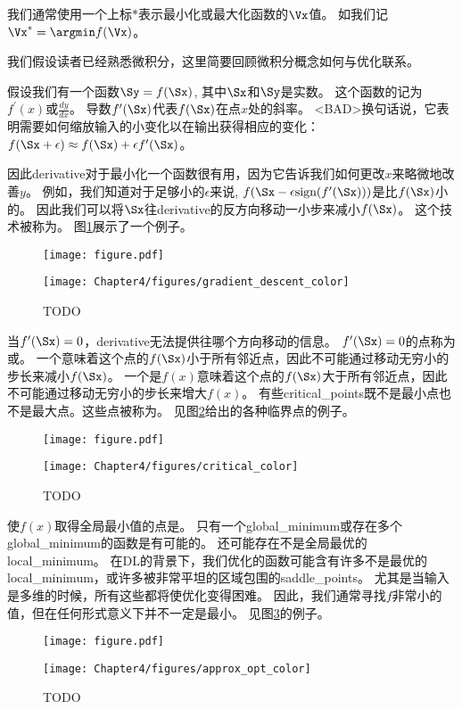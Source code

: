 我们通常使用一个上标$*$表示最小化或最大化函数的$\Vx$值。
如我们记$\Vx^*=\argmin f(\Vx)$。

我们假设读者已经熟悉微积分，这里简要回顾微积分概念如何与优化联系。


假设我们有一个函数$\Sy = f(\Sx)$, 其中$\Sx$和$\Sy$是实数。
这个函数的记为$f^\prime(x)$或$\frac{dy}{dx}$。
导数$f^\prime(\Sx)$代表$f(\Sx)$在点$x$处的斜率。
<BAD>换句话说，它表明需要如何缩放输入的小变化以在输出获得相应的变化：
$f(\Sx+\epsilon) \approx f(\Sx) + \epsilon f^\prime(\Sx) $。

因此\gls{derivative}对于最小化一个函数很有用，因为它告诉我们如何更改$x$来略微地改善$y$。
例如，我们知道对于足够小的$\epsilon$来说, $f(\Sx-\epsilon \text{sign}(f^\prime(\Sx)) )$是比$f(\Sx)$小的。
因此我们可以将$\Sx$往\gls{derivative}的反方向移动一小步来减小$f(\Sx)$。
这个技术被称为\citep{cauchy1847}。
图\ref{fig:chap4_gradient_descent_color}展示了一个例子。
\begin{figure}[!htb]
\ifOpenSource
\centerline{\texttt{[image: figure.pdf]}}
\else
\centerline{\texttt{[image: Chapter4/figures/gradient\_descent\_color]}}
\fi
\caption{TODO}
\label{fig:chap4_gradient_descent_color}
\end{figure}


当$f^\prime(\Sx)=0$，\gls{derivative}无法提供往哪个方向移动的信息。
$ f^\prime(\Sx)=0 $的点称为或。
一个意味着这个点的$f(\Sx)$小于所有邻近点，因此不可能通过移动无穷小的步长来减小$f(\Sx)$。
一个是$f(x)$意味着这个点的$f(\Sx)$大于所有邻近点，因此不可能通过移动无穷小的步长来增大$f(x)$。
有些\gls{critical_points}既不是最小点也不是最大点。这些点被称为。
见图\ref{fig:chap4_critical_color}给出的各种临界点的例子。
\begin{figure}[!htb]
\ifOpenSource
\centerline{\texttt{[image: figure.pdf]}}
\else
\centerline{\texttt{[image: Chapter4/figures/critical\_color]}}
\fi
\caption{TODO}
\label{fig:chap4_critical_color}
\end{figure}

使$f(x)$取得全局最小值的点是。
只有一个\gls{global_minimum}或存在多个\gls{global_minimum}的函数是有可能的。
还可能存在不是全局最优的\gls{local_minimum}。
在\gls{DL}的背景下，我们优化的函数可能含有许多不是最优的\gls{local_minimum}，或许多被非常平坦的区域包围的\gls{saddle_points}。
尤其是当输入是多维的时候，所有这些都将使优化变得困难。
因此，我们通常寻找$f$非常小的值，但在任何形式意义下并不一定是最小。
见图\ref{fig:chap4_approx_opt_color}的例子。
\begin{figure}[!htb]
\ifOpenSource
\centerline{\texttt{[image: figure.pdf]}}
\else
\centerline{\texttt{[image: Chapter4/figures/approx\_opt\_color]}}
\fi
\caption{TODO}
\label{fig:chap4_approx_opt_color}
\end{figure}

